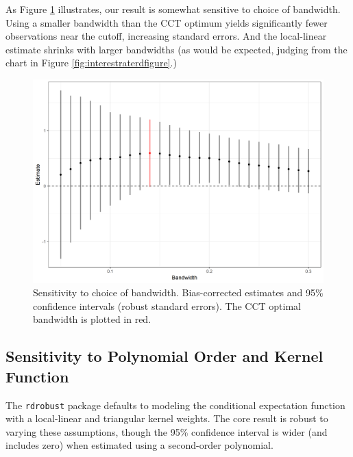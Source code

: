 \documentclass[12pt]{article}
\begin{document}
\begin{appendices}
	As Figure \ref{fig:bandwidthSensitivity} illustrates, our result is somewhat sensitive to choice of bandwidth. Using a smaller bandwidth than the CCT optimum yields significantly fewer observations near the cutoff, increasing standard errors. And the local-linear estimate shrinks with larger bandwidths (as would be expected, judging from the chart in Figure \ref{fig:interestraterdfigure}.) 
	
	
	\begin{figure}[h]
	\centering
	\includegraphics[width=\linewidth]{Figures/bandwidthSensitivity}
	\caption{Sensitivity to choice of bandwidth. Bias-corrected estimates and 95\% confidence intervals (robust standard errors). The CCT optimal bandwidth is plotted in red.}
	\label{fig:bandwidthSensitivity}
	\end{figure}

	\subsection{Sensitivity to Polynomial Order and Kernel Function}

	The \texttt{rdrobust} package defaults to modeling the conditional expectation function with a local-linear and triangular kernel weights. The core result is robust to varying these assumptions, though the 95\% confidence interval is wider (and includes zero) when estimated using a second-order polynomial.
	 

\end{appendices}
\end{document}
